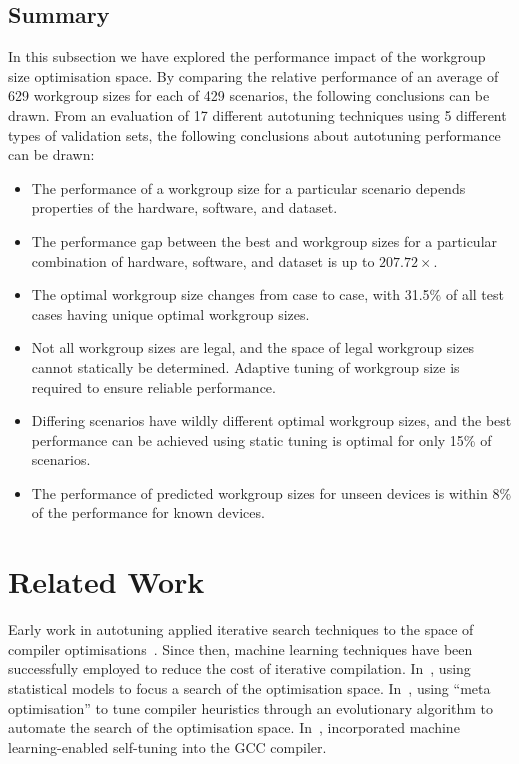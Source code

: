 \documentclass[nonatbib,preprint,9pt]{sigplanconf}
\begin{document}
\subsection{Summary}

In this subsection we have explored the performance impact of the
workgroup size optimisation space. By comparing the relative
performance of an average of 629 workgroup sizes for each of 429
scenarios, the following conclusions can be drawn. From an evaluation
of 17 different autotuning techniques using 5 different types of
validation sets, the following conclusions about autotuning
performance can be drawn:
%
\begin{itemize}
\item The performance of a workgroup size for a particular scenario
  depends properties of the hardware, software, and dataset.
\item The performance gap between the best and workgroup sizes for a
  particular combination of hardware, software, and dataset is up to
  $207.72\times$.
\item The optimal workgroup size changes from case to case, with
  31.5\% of all test cases having unique optimal workgroup sizes.
\item Not all workgroup sizes are legal, and the space of legal
  workgroup sizes cannot statically be determined. Adaptive tuning of
  workgroup size is required to ensure reliable performance.
\item Differing scenarios have wildly different optimal workgroup
  sizes, and the best performance can be achieved using static tuning
  is optimal for only 15\% of scenarios.
\item The performance of predicted workgroup sizes for unseen devices
  is within 8\% of the performance for known devices.
\end{itemize}


\section{Related Work}\label{sec:related}

Early work in autotuning applied iterative search techniques to the
space of compiler optimisations~\cite{Bodin1998,Kisuki}. Since then,
machine learning techniques have been successfully employed to reduce
the cost of iterative compilation. In~\cite{Agakov}, using statistical
models to focus a search of the optimisation
space. In~\cite{Stephenson2003}, using ``meta optimisation'' to tune
compiler heuristics through an evolutionary algorithm to automate the
search of the optimisation space. In~\cite{Fursin2011},
\citeauthor{Fursin2011} incorporated machine learning-enabled
self-tuning into the GCC compiler.
\end{document}
